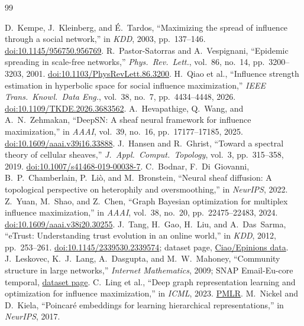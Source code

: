\documentclass[10pt,twocolumn]{article}
\begin{document}
\begin{thebibliography}{99}
\raggedright
{} D.~Kempe, J.~Kleinberg, and {\'E}.~Tardos, ``Maximizing the spread of influence through a social network,'' in \emph{KDD}, 2003, pp.~137--146. \href{https://doi.org/10.1145/956750.956769}{doi:10.1145/956750.956769}.
 R.~Pastor-Satorras and A.~Vespignani, ``Epidemic spreading in scale-free networks,'' \emph{Phys.\ Rev.\ Lett.}, vol.~86, no.~14, pp.~3200--3203, 2001. \href{https://doi.org/10.1103/PhysRevLett.86.3200}{doi:10.1103/PhysRevLett.86.3200}.
 H.~Qiao et al., ``Influence strength estimation in hyperbolic space for social influence maximization,'' \emph{IEEE Trans.\ Knowl.\ Data Eng.}, vol.~38, no.~7, pp.~4434--4448, 2026. \href{https://doi.org/10.1109/TKDE.2026.3683562}{doi:10.1109/TKDE.2026.3683562}.
 A.~Hevapathige, Q.~Wang, and A.~N.~Zehmakan, ``DeepSN: A sheaf neural framework for influence maximization,'' in \emph{AAAI}, vol.~39, no.~16, pp.~17177--17185, 2025. \href{https://doi.org/10.1609/aaai.v39i16.33888}{doi:10.1609/aaai.v39i16.33888}.
 J.~Hansen and R.~Ghrist, ``Toward a spectral theory of cellular sheaves,'' \emph{J.\ Appl.\ Comput.\ Topology}, vol.~3, pp.~315--358, 2019. \href{https://doi.org/10.1007/s41468-019-00038-7}{doi:10.1007/s41468-019-00038-7}.
 C.~Bodnar, F.~Di~Giovanni, B.~P.~Chamberlain, P.~Li{\`o}, and M.~Bronstein, ``Neural sheaf diffusion: A topological perspective on heterophily and oversmoothing,'' in \emph{NeurIPS}, 2022.
 Z.~Yuan, M.~Shao, and Z.~Chen, ``Graph Bayesian optimization for multiplex influence maximization,'' in \emph{AAAI}, vol.~38, no.~20, pp.~22475--22483, 2024. \href{https://doi.org/10.1609/aaai.v38i20.30255}{doi:10.1609/aaai.v38i20.30255}.
 J.~Tang, H.~Gao, H.~Liu, and A.~Das~Sarma, ``eTrust: Understanding trust evolution in an online world,'' in \emph{KDD}, 2012, pp.~253--261. \href{https://doi.org/10.1145/2339530.2339574}{doi:10.1145/2339530.2339574}; dataset page, \href{https://www.cse.msu.edu/~tangjili/datasetcode/truststudy.htm}{Ciao/Epinions data}.
 J.~Leskovec, K.~J.~Lang, A.~Dasgupta, and M.~W.~Mahoney, ``Community structure in large networks,'' \emph{Internet Mathematics}, 2009; SNAP Email-Eu-core temporal, \href{https://snap.stanford.edu/data/email-Eu-core-temporal.html}{dataset page}.
 C.~Ling et al., ``Deep graph representation learning and optimization for influence maximization,'' in \emph{ICML}, 2023. \href{https://proceedings.mlr.press/v202/ling23b.html}{PMLR}.
 M.~Nickel and D.~Kiela, ``Poincar\'e embeddings for learning hierarchical representations,'' in \emph{NeurIPS}, 2017.
\end{thebibliography}
\end{document}
